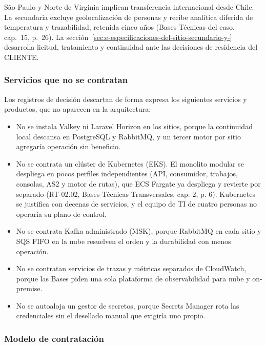 São Paulo y Norte de Virginia implican transferencia internacional desde Chile. La secundaria excluye geolocalización de personas y recibe analítica diferida de temperatura y trazabilidad, retenida cinco años (Bases Técnicas del caso, cap.~15, p.~26). La sección~\ref{sec:e-especificaciones-del-sitio-secundario-y-} desarrolla licitud, tratamiento y continuidad ante las decisiones de residencia del CLIENTE.

\subsubsection{Servicios que no se contratan}

Los registros de decisión descartan de forma expresa los siguientes servicios y productos, que no aparecen en la arquitectura:

\begin{itemize}
  \item No se instala Valkey ni Laravel Horizon en los sitios, porque la continuidad local descansa en PostgreSQL y RabbitMQ, y un tercer motor por sitio agregaría operación sin beneficio.
  \item No se contrata un clúster de Kubernetes (EKS). El monolito modular se despliega en pocos perfiles independientes (API, consumidor, trabajos, consolas, AS2 y motor de rutas), que ECS Fargate ya despliega y revierte por separado (RT-02.02, Bases Técnicas Transversales, cap. 2, p. 6). Kubernetes se justifica con decenas de servicios, y el equipo de TI de cuatro personas no operaría su plano de control.
  \item No se contrata Kafka administrado (MSK), porque RabbitMQ en cada sitio y SQS FIFO en la nube resuelven el orden y la durabilidad con menos operación.
  \item No se contratan servicios de trazas y métricas separados de CloudWatch, porque las Bases piden una sola plataforma de observabilidad para nube y on-premise.
  \item No se autoaloja un gestor de secretos, porque Secrets Manager rota las credenciales sin el desellado manual que exigiría uno propio.
\end{itemize}

\subsubsection{Modelo de contratación}

